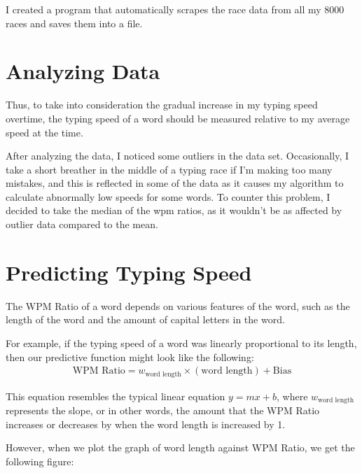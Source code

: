 \documentclass[12pt, demo]{article}
\begin{document}
I created a program that automatically scrapes the race data from all my 8000 races and saves them into a file.


\section*{Analyzing Data}

Thus, to take into consideration the gradual increase in my typing speed overtime, the typing speed of a word should be measured relative to my average speed at the time.

After analyzing the data, I noticed some outliers in the data set. Occasionally, I take a short breather in the middle of a typing race if I'm making too many mistakes, and this is reflected in some of the data as it causes my algorithm to calculate abnormally low speeds for some words. To counter this problem, I decided to take the median of the wpm ratios, as it wouldn't be as affected by outlier data compared to the mean.

\section*{Predicting Typing Speed}

The WPM Ratio of a word depends on various features of the word, such as the length of the word and the amount of capital letters in the word.

For example, if the typing speed of a word was linearly proportional to its length, then our predictive function might look like the following:
\begin{align*}
	\text{WPM Ratio} = w_{\text{word length}} \times (\text{word length}) + \text{Bias}
\end{align*}

This equation resembles the typical linear equation $y = mx + b$, where $w_{\text{word length}}$ represents the slope, or in other words, the amount that the WPM Ratio increases or decreases by when the word length is increased by 1.

However, when we plot the graph of word length against WPM Ratio, we get the following figure:
\end{document}
